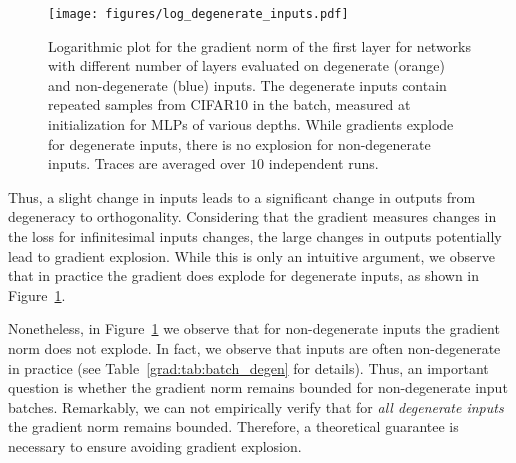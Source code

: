 \begin{figure}[ht]
    \centering
    \texttt{[image: figures/log\_degenerate\_inputs.pdf]}
    \caption{Logarithmic plot for the gradient norm of the first layer for networks with different number of layers evaluated on degenerate (orange) and non-degenerate (blue) inputs. The degenerate inputs contain repeated samples from CIFAR10 in the batch, measured at initialization for MLPs of various depths. While gradients explode for degenerate inputs, there is no explosion for non-degenerate inputs. Traces are averaged over $10$ independent runs.}
    \label{grad:fig:degenerate_input}
\end{figure}
Thus, a slight change in inputs leads to a significant change in outputs from degeneracy to orthogonality. Considering that the gradient measures changes in the loss for infinitesimal inputs changes, the large changes in outputs potentially lead to gradient explosion. While this is only an intuitive argument, we observe that in practice the gradient does explode for degenerate inputs, as shown in Figure~\ref{grad:fig:degenerate_input}. 

Nonetheless, in Figure~\ref{grad:fig:degenerate_input} we observe that for non-degenerate inputs the gradient norm does not explode. In fact, we observe that inputs are often non-degenerate in practice (see Table~\ref{grad:tab:batch_degen} for details). Thus, an important question is whether the gradient norm remains bounded for non-degenerate input batches. Remarkably, we can not empirically verify that for \emph{all degenerate inputs} the gradient norm remains bounded. Therefore, a theoretical guarantee is necessary to ensure avoiding gradient explosion. 

